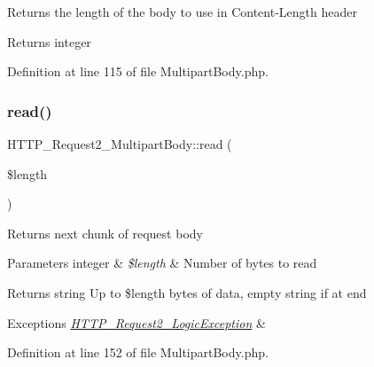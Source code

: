 Returns the length of the body to use in Content-\/\+Length header

\begin{DoxyReturn}{Returns}
integer 
\end{DoxyReturn}


Definition at line 115 of file Multipart\+Body.\+php.

\mbox{\label{classHTTP__Request2__MultipartBody_aa392b34f91cbaf97962b7f77ea287cad}} 
\subsubsection{\texorpdfstring{read()}{read()}}
{\footnotesize\ttfamily H\+T\+T\+P\+\_\+\+Request2\+\_\+\+Multipart\+Body\+::read (\begin{DoxyParamCaption}\item[{}]{\$length }\end{DoxyParamCaption})}

Returns next chunk of request body


\begin{DoxyParams}[1]{Parameters}
integer & {\em \$length} & Number of bytes to read\\
\hline
\end{DoxyParams}
\begin{DoxyReturn}{Returns}
string Up to \$length bytes of data, empty string if at end 
\end{DoxyReturn}

\begin{DoxyExceptions}{Exceptions}
{\em \hyperlink{classHTTP__Request2__LogicException}{H\+T\+T\+P\+\_\+\+Request2\+\_\+\+Logic\+Exception}} & \\
\hline
\end{DoxyExceptions}


Definition at line 152 of file Multipart\+Body.\+php.

\mbox{\label{classHTTP__Request2__MultipartBody_af603c54ddf7736f0cbfcab11f64e089b}} 
